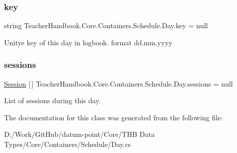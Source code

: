 \subsubsection{\texorpdfstring{key}{key}}
{\footnotesize\ttfamily string Teacher\+Handbook.\+Core.\+Containers.\+Schedule.\+Day.\+key = null}



Unitye key of this day in logbook. format dd.\+mm.\+yyyy 

\mbox{\label{class_teacher_handbook_1_1_core_1_1_containers_1_1_schedule_1_1_day_ab7130291674ea826085d0090d6acdddb}} 
\subsubsection{\texorpdfstring{sessions}{sessions}}
{\footnotesize\ttfamily \mbox{\hyperlink{class_teacher_handbook_1_1_core_1_1_containers_1_1_schedule_1_1_session}{Session}} \mbox{[}$\,$\mbox{]} Teacher\+Handbook.\+Core.\+Containers.\+Schedule.\+Day.\+sessions = null}



List of sessions during this day. 



The documentation for this class was generated from the following file\+:\begin{DoxyCompactItemize}
\item 
D\+:/\+Work/\+Git\+Hub/datum-\/point/\+Core/\+T\+H\+B Data Types/\+Core/\+Containers/\+Schedule/Day.\+cs\end{DoxyCompactItemize}
